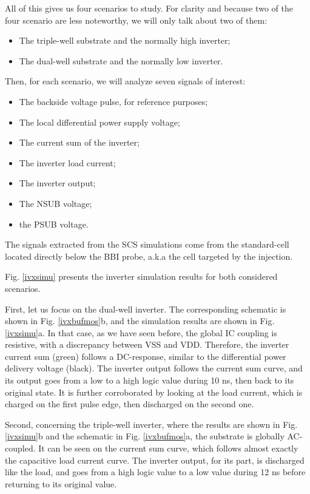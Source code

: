 	All of this gives us four scenarios	 to study.
	For clarity and because two of the four scenario are less noteworthy, we will only talk about two of them:
	\begin{itemize}
		\item The triple-well substrate and the normally high inverter;
		\item The dual-well substrate and the normally low inverter.
	\end{itemize}
	Then, for each scenario, we will analyze seven signals of interest:
	\begin{itemize}
		\item The backside voltage pulse, for reference purposes;
		\item The local differential power supply voltage;
		\item The current sum of the inverter;
		\item The inverter load current;
		\item The inverter output;
		\item The NSUB voltage;
		\item the PSUB voltage.
	\end{itemize}
	The signals extracted from the SCS simulations come from the standard-cell located directly below the BBI probe, a.k.a the cell targeted by the injection.
	
	Fig. \ref{ivxsimu} presents the inverter simulation results for both considered scenarios.

	First, let us focus on the dual-well inverter.
	The corresponding schematic is shown in Fig. \ref{ivxbufmos}b, and the simulation results are shown in Fig. \ref{ivxsimu}a.
	In that case, as we have seen before, the global IC coupling is resistive, with a discrepancy between VSS and VDD.
	Therefore, the inverter current sum (green) follows a DC-response, similar to the differential power delivery voltage (black).
	The inverter output follows the current sum curve, and its output goes from a low to a high logic value during 10 ns, then back to its original state.
	It is further corroborated by looking at the load current, which is charged on the first pulse edge, then discharged on the second one.

	Second, concerning the triple-well inverter, where the results are shown in Fig. \ref{ivxsimu}b and the schematic in Fig. \ref{ivxbufmos}a, the substrate is globally AC-coupled.
	It can be seen on the current sum curve, which follows almost exactly the capacitive load current curve.
	The inverter output, for its part, is discharged like the load, and goes from a high logic value to a low value during 12 ns before returning to its original value.


